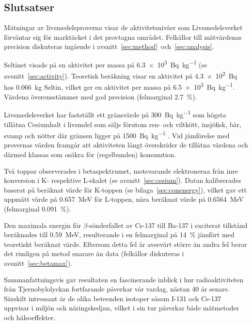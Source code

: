\subsection{Slutsatser} \label{sec:conclusions}

Mätningar av livsmedelsproverna visar de aktivitetsnivåer som Livsmedelsverket
\parencite{livsmedelsverket} förväntar sig för marktäcket i det provtagna
området. Felkällor till mätvärdenas precision diskuteras ingående i
avsnitt~\ref{sec:method}~och~\ref{sec:analysis}.

Seltinet visade på en aktivitet per massa på \qty{6.3e3}{\becquerel\per\kg}
(se avsnitt~\ref{sec:activity}). Teoretisk beräkning visar en aktivitet på
\qty{4.3e2}{\becquerel} hos \qty{0.066}{\kg} Seltin, vilket ger en aktivitet
per massa på \qty{6.5e3}{\becquerel\per\kg}. Värdena överensstämmer med god
precision (felmarginal \qty{2.7}{\percent}).

Livsmedelsverket har fastställt ett gränsvärde på \qty{300}{\becquerel\per\kg} 
som högsta tillåtna Cesiumhalt i livsmdel som säljs förutom ren- och viltkött,
insjöfisk, bär, svamp och nötter där gränsen ligger på
\qty{1500}{\becquerel\per\kg} \parencite{livsmedelsverket}. Vid jämförelse
med provernas värden framgår att aktiviteten långt överskrider de tillåtna
värdena och därmed klassas som osäkra för (regelbunden) konsumtion.

Två toppar observerades i betaspektrumet, motsvarande elektronerna från inre
konversion i K- respektive L-skalet (se avsnitt~\ref{sec:cesium}). Datan
kalibrerades baserat på beräknat värde för K-toppen (se
bilaga~\ref{sec:conenergy}), vilket gav ett uppmätt värde på \qty{0.657}{\MeV}
för L-toppen, nära beräknat värde på \qty{0.6564}{\MeV} (felmarginal
\qty{0.091}{\percent}).

Den maximala energin för $\beta$-sönderfallet av Cs-137 till Ba-137 i exciterat
tillstånd beräknades till \qty{0.59}{\MeV}, resulterande i en felmarginal på
\qty{14}{\percent} jämfört med teoretiskt beräknat värde. Eftersom detta fel är
avsevärt större än andra fel beror det rimligen på metod snarare än data
(felkällor diskuteras i avsnitt~\ref{sec:betamax}).

Sammanfattningsvis gav resultaten en fascinerande inblick i hur
radioaktiviteten från Tjernobylolyckan fortfarande påverkar vår vardag, nästan
\num{40} år senare. Särskilt intressant är de olika beteenden isotoper såsom
I-131 och Cs-137 uppvisar i miljön och näringskedjan, vilket i sin tur påverkar
både mätmetoder och hälsoeffekter.
